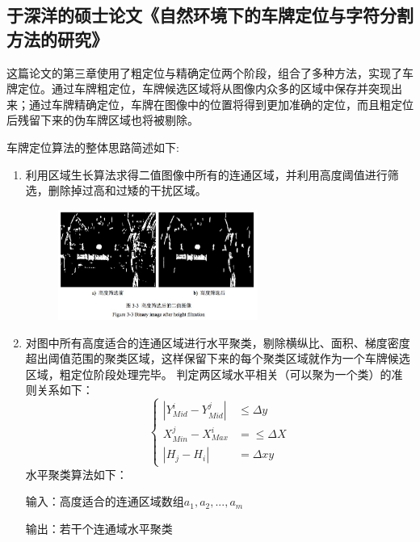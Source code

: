 \subsection{于深洋的硕士论文《自然环境下的车牌定位与字符分割方法的研究》}
这篇论文的第三章使用了粗定位与精确定位两个阶段，组合了多种方法，实现了车牌定位。通过车牌粗定位，车牌候选区域将从图像内众多的区域中保存并突现出来；通过车牌精确定位，车牌在图像中的位置将得到更加准确的定位，而且粗定位后残留下来的伪车牌区域也将被剔除。 

车牌定位算法的整体思路简述如下:
\begin{enumerate}
\item
利用区域生长算法求得二值图像中所有的连通区域，并利用高度阈值进行筛选，删除掉过高和过矮的干扰区域。 
\begin{figure}[H]
    \centering 
    \includegraphics[width=0.618\textwidth]{image/2_5_1.jpg}    
    \label{logic}
\end{figure}
\item
对图中所有高度适合的连通区域进行水平聚类，剔除横纵比、面积、梯度密度超出阈值范围的聚类区域，这样保留下来的每个聚类区域就作为一个车牌候选区域，粗定位阶段处理完毕。 判定两区域水平相关（可以聚为一个类）的准则关系如下：
$$\left\{
\begin{aligned}
|Y^i_{Mid}-Y^j_{Mid}| & \leq \Delta y \\
X^j_{Min}-X^i_{Max} & = \leq \Delta X\\
|H_j-H_i| & = \Delta xy
\end{aligned}
\right.
$$
水平聚类算法如下：

输入：高度适合的连通区域数组$a_1, a_2, ..., a_m$

输出：若干个连通域水平聚类


\end{enumerate}
